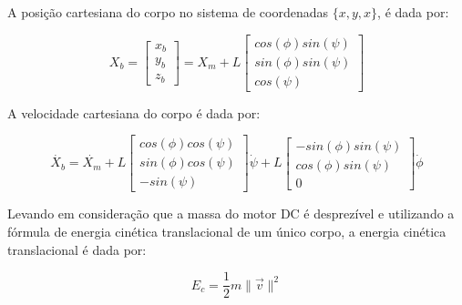 \documentclass[10pt]{article}
\begin{document}
\quad A posição cartesiana do corpo no sistema de coordenadas $\{x, y, x\}$,
é dada por:

\begin{equation}
    X_b = 
    \begin{bmatrix}
        x_b \\
        y_b \\
        z_b
    \end{bmatrix} = X_m + L
    \begin{bmatrix}
        cos(\phi) sin(\psi) \\
        sin(\phi) sin(\psi) \\
        cos(\psi)
    \end{bmatrix}
\end{equation}

\quad A velocidade cartesiana do corpo é dada por:

\begin{equation}
    \dot{X_b} = \dot{X_m} + L
    \begin{bmatrix}
        cos(\phi) cos(\psi) \\
        sin(\phi) cos(\psi) \\
        -sin(\psi)
    \end{bmatrix} \dot{\psi} + L
    \begin{bmatrix}
        -sin(\phi) sin(\psi) \\
        cos(\phi) sin(\psi) \\
        0
    \end{bmatrix} \dot{\phi}
\end{equation}

\quad Levando em consideração que a massa do motor DC é desprezível e
utilizando a fórmula de energia cinética translacional de um único corpo,
a energia cinética translacional é dada por:

\begin{equation}
    E_c = \frac{1}{2} m \|\vec{v}\|^2
\end{equation}
\end{document}
